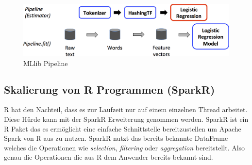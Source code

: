 \begin{figure}[h]
  \centering
  \includegraphics[width=\textwidth]{./bilder/ml-pipeline.png}
  \caption{MLlib Pipeline \cite{SPMLLIB}}\label{fig:spark_ml_pipeline}
\end{figure}






\newpage
\subsection{Skalierung von R Programmen (SparkR)}\label{sec_sparkr}

\noindent
R hat den Nachteil, dass es zur Laufzeit nur auf einem einzelnen Thread arbeitet. Diese Hürde kann mit der SparkR Erweiterung genommen werden. SparkR ist ein R Paket das es ermöglicht eine einfache Schnittstelle bereitzustellen um Apache Spark von R aus zu nutzen. SparkR nutzt das bereits bekannte DataFrame welches die Operationen wie \textsl{selection}, \textsl{filtering} oder \textsl{aggregation} bereitstellt. Also genau die Operationen die aus R dem Anwender bereits bekannt sind. \\

